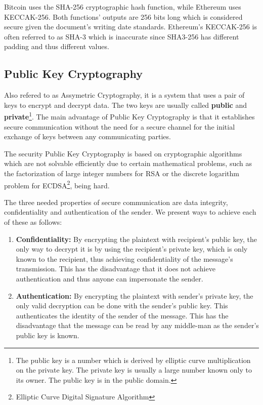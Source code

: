 Bitcoin uses the SHA-256 cryptographic hash function, while Ethereum uses KECCAK-256. Both functions' outputs are 256 bits long which is considered secure given the document's writing date standards. Ethereum's KECCAK-256 is often referred to as SHA-3 which is inaccurate since SHA3-256 has different padding and thus different values\cite{sha3}.

\subsection{Public Key Cryptography}
Also refered to as Assymetric Cryptography, it is a system that uses a pair of keys to encrypt and decrypt data. The two keys are usually called \textbf{public} and \textbf{private}\footnote{The public key is a number which is derived by elliptic curve multiplication on the private key. The private key is usually a large number known only to its owner. The public key is in the public domain.}. The main advantage of Public Key Cryptography is that it establishes secure communication without the need for a secure channel for the initial exchange of keys between any communicating parties.

The security Public Key Cryptography is based on cryptographic algorithms which are not solvable efficiently due to certain mathematical problems, such as the factorization of large integer numbers for RSA or the discrete logarithm problem for ECDSA\footnote{Elliptic Curve Digital Signature Algorithm}, being hard.

The three needed properties of secure communication are data integrity, confidentiality and authentication of the sender. We present ways to achieve each of these as follows:

\begin{enumerate}
    \item \textbf{Confidentiality:} By encrypting the plaintext with recipient's public key, the only way to decrypt it is by using the recipient's private key, which is only known to the recipient, thus achieving confidentiality of the message's transmission. This has the disadvantage that it does not achieve authentication and thus anyone can impersonate the sender.
    \item \textbf{Authentication:} By encrypting the plaintext with sender's private key, the only valid decryption can be done with the sender's public key. This authenticates the identity of the sender of the message. This has the disadvantage that the message can be read by any middle-man as the sender's public key is known.
\end{enumerate}

